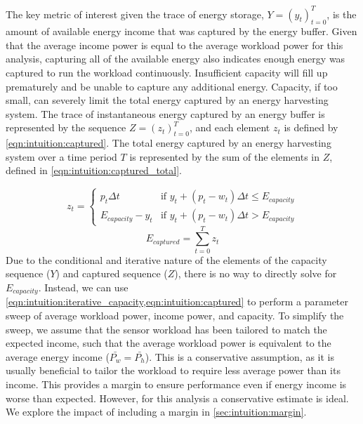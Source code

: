 The key metric of interest given the trace of energy storage, $Y = (y_t)_{t=0}^T$, is  
the amount of available energy income that was captured by the energy buffer. 
Given that the average income power is equal to the average workload power for this analysis, capturing all of the available energy also indicates enough energy was captured to run the workload continuously. 
Insufficient capacity will fill up prematurely and be unable to capture any additional energy. 
Capacity, if too small, can severely limit the total energy captured by an energy harvesting system.
The trace of instantaneous energy captured by an energy buffer is represented by the sequence $Z = (z_t)^T_{t=0}$, and each element $z_t$ is defined by \cref{eqn:intuition:captured}. The total energy captured by an energy harvesting system over a time period $T$ is represented by the sum of the elements in $Z$, defined in \cref{eqn:intuition:captured_total}.

\begin{equation} \label{eqn:intuition:captured}
    z_t = \begin{cases}
        p_t \Delta t & \text{if $y_t + (p_t - w_t) \Delta t \leq E_{capacity}$} \\
        E_{capacity} - y_t & \text{if $y_t + (p_t - w_t) \Delta t > E_{capacity}$} 
    \end{cases}
\end{equation}
\begin{equation} \label{eqn:intuition:captured_total}
    E_{captured} = \sum^T_{t=0} z_t
\end{equation}
Due to the conditional and iterative nature of the elements of the capacity sequence ($Y$) and captured sequence ($Z$), there is no way to directly solve for $E_{capacity}$.
Instead, we can use \cref{eqn:intuition:iterative_capacity,eqn:intuition:captured} to perform a parameter sweep of average workload power, income power, and capacity.
To simplify the sweep, we assume that the sensor workload has been tailored to match the expected income, such that the average workload power is equivalent to the average energy income ($\bar{P_w} = \bar{P_h}$). 
This is a conservative assumption, as it is usually beneficial to tailor the workload to require less average power than its income. 
This provides a margin to ensure performance even if energy income is worse than expected. However, for this analysis a conservative estimate is ideal. We explore the impact of including a margin in \cref{sec:intuition:margin}.

